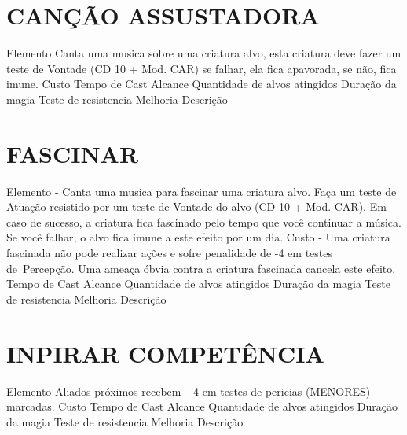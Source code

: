 \documentclass{article}%
\begin{document}
%
\section{CANÇÃO ASSUSTADORA}%
\label{sec:CANOASSUSTADORA}%
Elemento Canta uma musica sobre uma criatura alvo, esta criatura deve fazer um teste de Vontade (CD 10 + Mod. CAR) se falhar, ela fica apavorada, se não, fica imune.\newline%
Custo \newline%
Tempo de Cast \newline%
Alcance \newline%
Quantidade de alvos atingidos \newline%
Duração da magia \newline%
Teste de resistencia \newline%
Melhoria \newline%
Descrição \newline%

%
\section{FASCINAR}%
\label{sec:FASCINAR}%
Elemento {-} Canta uma musica para fascinar uma criatura alvo. Faça um teste de Atuação resistido por um teste de Vontade do alvo (CD 10 + Mod. CAR). Em caso de sucesso, a criatura fica fascinado pelo tempo que você continuar a música. Se você falhar, o alvo fica imune a este efeito por um dia.\newline%
Custo {-} Uma criatura fascinada não pode realizar ações e sofre penalidade de {-}4 em testes de~Percepção. Uma ameaça óbvia contra a criatura fascinada cancela este efeito.\newline%
Tempo de Cast \newline%
Alcance \newline%
Quantidade de alvos atingidos \newline%
Duração da magia \newline%
Teste de resistencia \newline%
Melhoria \newline%
Descrição \newline%

%
\section{INPIRAR COMPETÊNCIA}%
\label{sec:INPIRARCOMPETNCIA}%
Elemento Aliados próximos recebem +4 em testes de pericias (MENORES) marcadas.\newline%
Custo \newline%
Tempo de Cast \newline%
Alcance \newline%
Quantidade de alvos atingidos \newline%
Duração da magia \newline%
Teste de resistencia \newline%
Melhoria \newline%
Descrição \newline%
\end{document}
